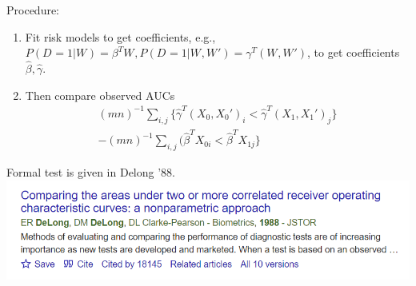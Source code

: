 \documentclass{beamer}
\newcommand{\X}[1][]{X_{0#1}}
\newcommand{\Y}[1][]{X_{1#1}}
\newcommand{\W}[1][]{W_{#1}}
\newcommand{\D}[1][]{D_{#1}}
\renewcommand{\t}[1]{{#1}^T}
\newcommand{\m}{m}
\newcommand{\n}{n}
\newcommand{\speak}[1]{
  \iftoggle{speaktoggle}{
    {\tiny{\textcolor{red}{speak: #1}}\normalsize}
  }
  {}
}
\begin{document}
\begin{frame}
  Procedure:
  \begin{enumerate}
\item Fit risk models to get coefficients, e.g., $P(\D=1 | \W)=\t\beta \W,P(\D=1 | \W,\W')=\t\gamma (\W,\W')$, to get coefficients $\hat\beta,\hat\gamma$.
\item Then compare observed AUCs
\begin{align}
(\m\n)^{-1} \sum_{i,j}\{\hat\gamma^T (\X,\X')_i < \hat\gamma^T (\Y,\Y')_j\} \\- (\m\n)^{-1}\sum_{i,j}(\hat\beta^T \X[i] < \hat\beta^T \Y[j]\}
\end{align}
\end{enumerate}
Formal test is given in Delong '88.
\includegraphics[width=\textwidth]{delong.png}
\end{frame}
\end{document}
